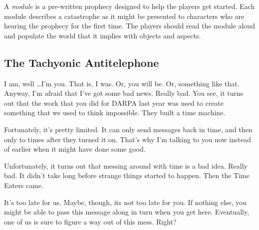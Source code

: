 \documentclass[12pt, a5paper, parskip=half-]{scrartcl}
\begin{document}
A \emph{module} is a pre-written prophecy designed to help the players get started.
Each module describes a catastrophe as it might be presented to characters who are hearing the prophecy for the first time.  The players should read the module aloud and populate the world that it implies with objects and aspects.

\subsection*{The Tachyonic Antitelephone} \label{subsection:the-tachyonic-antitelephone}
I am, well \ldots I'm you.  That is, I was. Or, you will be.  Or, something like that. Anyway, I'm afraid that I've got some bad news. Really bad. You see, it turns out that the work that you did for DARPA last year was used to create something that we used to think impossible.
They built a time machine. 

Fortunately, it's pretty limited.  It can only send messages back in time, and then only to times after they turned it on.  That's why I'm talking to you now instead of earlier when it might have done some good.

Unfortunately, it turns out that messing around with time is a bad idea.
Really bad. It didn't take long before strange things started to happen.
Then the Time Eaters came.

It's too late for us. 
Maybe, though, its not too late for you.
If nothing else, you might be able to pass this message along in turn when you get here. 
Eventually, one of us is sure to figure a way out of this mess.
Right?

%
%
\end{document}
